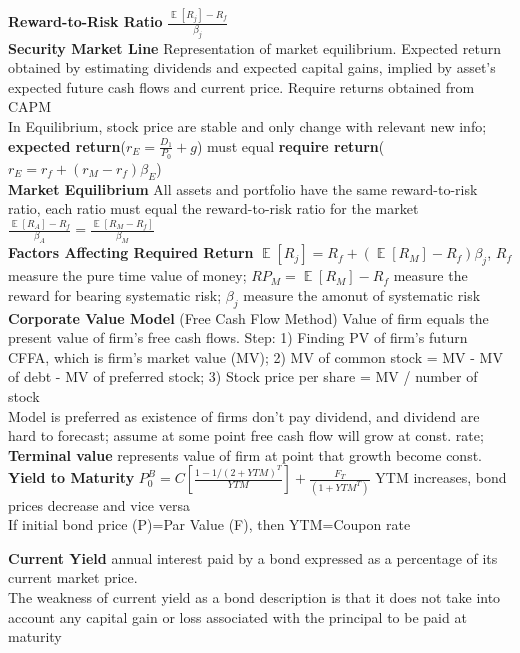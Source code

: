 \documentclass[12pt,landscape, a4paper]{article}
\theoremstyle{remark}
\newcommand{\E}{\operatorname{\mathbb{E}}}
\begin{document}
\begin{multicols*}{3}
\textbf{Reward-to-Risk Ratio} $\frac{\E [R_j] - R_f}{\beta_j}$\\
\textbf{Security Market Line} Representation of market equilibrium. Expected return obtained by estimating dividends and expected capital gains, implied by asset's expected future cash flows and current price. Require returns obtained from CAPM\\
In Equilibrium, stock price are stable and only change with relevant new info; \textbf{expected return}($r_E = \frac{D_1}{P_0} + g$) must equal \textbf{require return}($r_E = r_f + (r_M - r_f)\beta_E$)\\
\textbf{Market Equilibrium} All assets and portfolio have the same reward-to-risk ratio, each ratio must equal the reward-to-risk ratio for the market $\frac{\E [R_A] -R_f}{\beta_A} = \frac{\E [R_M - R_f]}{\beta_M}$\\

\textbf{Factors Affecting Required Return} $\E [R_j] = R_f + (\E [R_M] -R_f) \beta_j$, $R_f$ measure the pure time value of money; $RP_M = \E [R_M] -R_f$ measure the reward for bearing systematic risk; $\beta_j$ measure the amonut of systematic risk\\

\textbf{Corporate Value Model} (Free Cash Flow Method) Value of firm equals the present value of firm's free cash flows. Step: 1) Finding PV of firm's futurn CFFA, which is firm's market value (MV); 2) MV of common stock = MV - MV of debt - MV of preferred stock; 3) Stock price per share = MV / number of stock\\
Model is preferred as existence of firms don't pay dividend, and dividend are hard to forecast; assume at some point free cash flow will grow at const. rate; \textbf{Terminal value} represents value of firm at point that growth become const.\\

\textbf{Yield to Maturity} $P^B_0 = C \left[\frac{1- 1/(2+YTM)^T}{YTM}\right] + \frac{F_T}{(1+YTM^T)}$ YTM increases, bond prices decrease and vice versa\\
If initial bond price (P)=Par Value (F), then YTM=Coupon rate

\textbf{Current Yield} annual interest paid by a bond expressed as a percentage of its current market price.\\
The weakness of current yield as a bond description is that it does not take into account any capital gain or loss associated with the principal to be paid at maturity\\


\end{multicols*}
\end{document}

